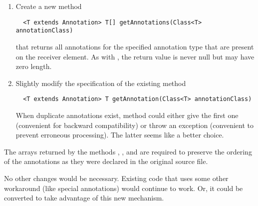 \documentclass[10pt]{article}
\begin{document}
\begin{enumerate}

\item
Create a new method

\begin{Verbatim}
  <T extends Annotation> T[] getAnnotations(Class<T> annotationClass)
\end{Verbatim}


\noindent
that returns all annotations for the specified annotation type that are
present on the receiver element.  As with ,
the return value is never null but may have zero length.

\item
Slightly modify the specification of the existing method

\begin{Verbatim}
  <T extends Annotation> T getAnnotation(Class<T> annotationClass)
\end{Verbatim}

\noindent
When duplicate annotations exist, method  could either
give the first one (convenient for backward compatibility) or throw an
exception (convenient to prevent erroneous processing).  The latter seems
like a better choice.


\end{enumerate}

The arrays returned by the methods ,  
, and  are required
to preserve the ordering of the annotations as they were declared in the
original  source file.

No other changes would be necessary.  Existing code that uses
some other workaround (like special  annotations) would
continue to work.  Or, it could be converted to take advantage of this new
mechanism.
\end{document}
